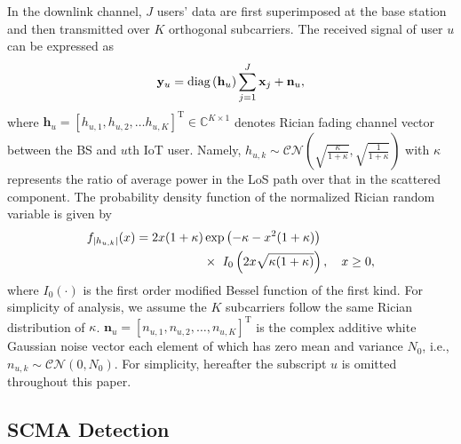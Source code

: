 \documentclass[journal]{IEEEtran}
\begin{document}
In the downlink channel, $J$ users’ data are first superimposed at the base station and then transmitted over $K$ orthogonal subcarriers. The received signal of user $u$ can be expressed as
\begin{equation}  \label{downlink}
 \small
\mathbf{y}_u=\text{diag}\left( {{\mathbf{h}}_{u}} \right)\sum\limits_{j=1}^{J}{{{\mathbf{x}}_{j}}}+\mathbf{n}_u,
\end{equation} 
where ${{\mathbf{h}}_{u}}={{\left[ {{h}_{u,1}},{{h}_{u,2}},\ldots {{h}_{u,K}} \right]}^{\text{T}}} \in {{\mathbb{C}}^{K\times 1}}$ denotes Rician fading channel   vector between the BS and $u$th IoT user.    Namely, ${{h}_{u,k}} \sim \mathcal{CN}\left ({\sqrt{ \frac {\kappa}{1+\kappa}}, \sqrt{ \frac {1}{1+\kappa}}  }\right )$ with  $\kappa$ represents the ratio of average power in the  LoS path  over that in the scattered component. The probability density function of the normalized Rician random variable  is given by  \cite{xin2003space}
 \begin{equation}
 \begin{aligned} 
 \small
 f_{\left| h_{u,k}\right|}(x) = 2x (1 + \kappa) &\exp\left(-\kappa - x^{2}(1 + \kappa)\right) \\
&\times \ I_{0}\left(2x\sqrt{\kappa(1 + \kappa)}\right), \quad x \geq 0,
 \end{aligned}
 \notag
 \end{equation}
where $I_{0}(\cdot)$ is the first order modified Bessel function of the first kind.   For simplicity of analysis, we assume the $K$ subcarriers follow the same Rician distribution of $\kappa$.  
${{\mathbf{n}_u} = \left [{ {n_{u,1},{n_{u,2}},\ldots ,{n_{u,K}}} }\right ] }^{\text{T}}$ is the complex additive white Gaussian noise   vector each element of which has zero mean and variance $N_{0}$, i.e., ${{n}_{u,k}} \sim \mathcal{CN}\left ({0, {N_0} }\right )$.  For simplicity, hereafter the subscript $u$ is omitted throughout  this paper.

\subsection{SCMA Detection}
\end{document}
